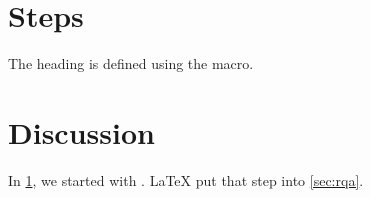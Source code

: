 \documentclass{article}
\begin{document}

\section{Steps}
\label{sec:steps}

\label{sec:rqa}
The heading is defined using the macro.


\section{Discussion}

In \cref{sec:steps}, we started with .
\LaTeX{} put that step into \cref{sec:rqa}.
\end{document}
